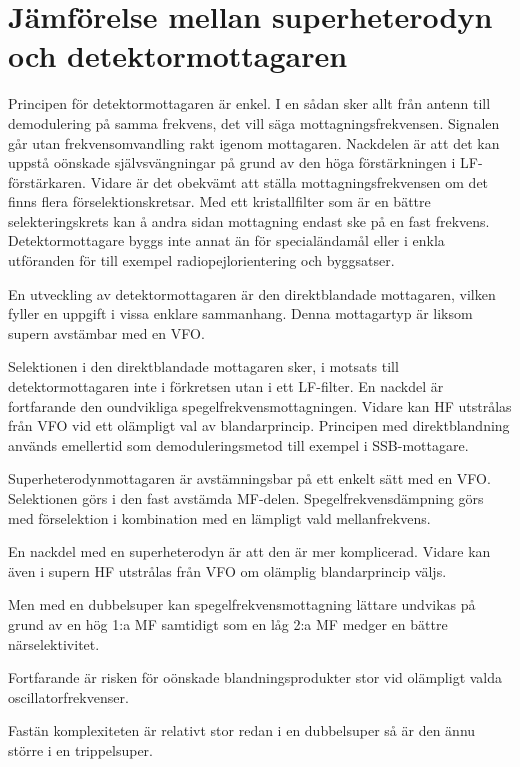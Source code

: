 \newpage
\section[Jämförelse superheterodyn]{Jämförelse mellan superheterodyn och detektormottagaren}
\label{superheterojämförelse}

Principen för detektormottagaren är enkel.
I en sådan sker allt från antenn till demodulering på samma frekvens,
det vill säga mottagningsfrekvensen.
Signalen går utan frekvensomvandling rakt igenom mottagaren.
Nackdelen är att det kan uppstå oönskade självsvängningar på grund av den
höga förstärkningen i LF-förstärkaren.
Vidare är det obekvämt att ställa mottagningsfrekvensen om det finns flera
förselektionskretsar.
Med ett kristallfilter som är en bättre selekteringskrets kan å andra sidan
mottagning endast ske på en fast frekvens.
Detektormottagare byggs inte annat än för specialändamål eller i enkla
utföranden för till exempel radiopejlorientering och byggsatser.

En utveckling av detektormottagaren är den direktblandade mottagaren,
vilken fyller en uppgift i vissa enklare sammanhang.
Denna mottagartyp är liksom supern avstämbar med en VFO.

Selektionen i den direktblandade mottagaren sker, i motsats till
detektormottagaren inte i förkretsen utan i ett LF-filter.
En nackdel är fortfarande den oundvikliga spegelfrekvensmottagningen.
Vidare kan HF utstrålas från VFO vid ett olämpligt val av blandarprincip.
Principen med direktblandning används emellertid som demoduleringsmetod till
exempel i SSB-mottagare.

Superheterodynmottagaren är avstämningsbar på ett enkelt sätt med en VFO.
Selektionen görs i den fast avstämda MF-delen.
Spegelfrekvensdämpning görs med förselektion i kombination med en lämpligt
vald mellanfrekvens.

En nackdel med en superheterodyn är att den är mer komplicerad.
Vidare kan även i supern HF utstrålas från VFO om olämplig blandarprincip väljs.

Men med en dubbelsuper kan spegelfrekvensmottagning lättare undvikas på grund
av en hög 1:a MF samtidigt som en låg 2:a MF medger en bättre närselektivitet.

Fortfarande är risken för oönskade blandningsprodukter stor vid
olämpligt valda oscillatorfrekvenser.

Fastän komplexiteten är relativt stor redan i en dubbelsuper så är den
ännu större i en trippelsuper.
